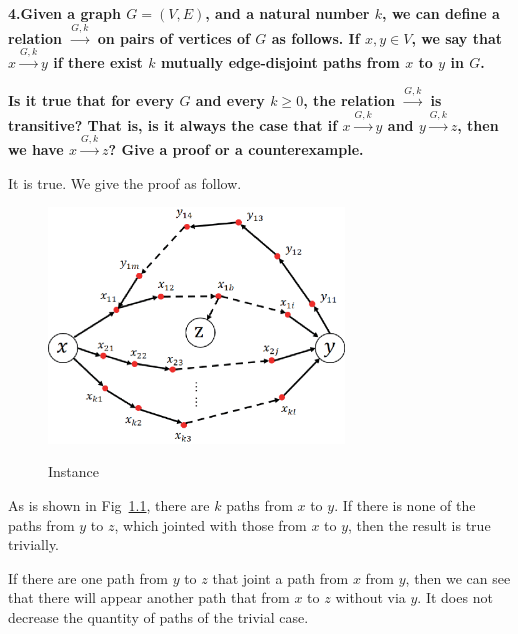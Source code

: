 
\chapter{}
\textbf{
4.Given a graph $G=(V,E)$, and a natural number $k$, we can define a relation $\stackrel{G,k}{\longrightarrow}$ on pairs of vertices of $G$ as follows. If $x,y\in V$, we say that $x\stackrel{G,k}{\longrightarrow}y$ if there exist $k$ mutually edge-disjoint paths from $x$ to $y$ in $G$.
}

\textbf{Is it true that for every $G$ and every $k\geq 0$, the relation $\stackrel{G,k}{\longrightarrow}$ is transitive? That is, is it always the case that if $x\stackrel{G,k}{\longrightarrow}y$ and $y\stackrel{G,k}{\longrightarrow}z$, then we have $x\stackrel{G,k}{\longrightarrow}z$? Give a proof or a counterexample.
}

It is true. We give the proof as follow.
\begin{figure}[H]
  \centering
  \includegraphics[width=0.7\textwidth]{figures/1.eps}\\
  \caption{Instance}\label{q4_1}
\end{figure}

As is shown in Fig~\ref{q4_1}, there are $k$ paths from $x$ to $y$. If there is none of the paths from $y$ to $z$, which jointed with those from $x$ to $y$, then the result is true trivially.

If there are one path from $y$ to $z$ that joint a path from $x$ from $y$, then we can see that there will appear another path that from $x$ to $z$ without via $y$. It does not decrease the quantity of paths of the trivial case.

